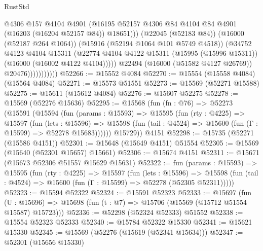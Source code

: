 \begin{lexlean}{RustStd}
\begin{coremodule}
                                @4306
                                @157
                                @4104
                                @4901
                                (@16195
                                  @52157
                                  @4306
                                  @84
                                  @4104
                                  @84
                                  @4901
                                  (@16203 (@16204 @52157 @84))
                                  @18651)))
                            (@22045 (@52183 @84))
                            (@16000 (@52187 @264 @1064))
                            (@15916 (@52194 @1064 @101 @5749 @4518))
                            (@34752
                              @4123
                              @4104
                              @15311
                              (@22774
                                @4104
                                @4122
                                @15311
                                (@15995 (@15996 @15311))
                                (@16000 (@16002 @4122 @4104)))))
                          @22494
                          (@16000 (@51582 @4127 @26769))
                          @20476)))))))))))
@52266 := @15552 @4084
@52270 := @15554 (@15558 @4084) (@15564 @4084)
@52271 := @15573 @51551
@52273 := @15569 (@52271 @15588)
@52275 := @15611 (@15612 @4084)
@52276 := @15607 @52275
@52278 := @15569 (@52276 @15636)
@52295 := @15568
    (fun (fn : @76) =>
    @52273
      (@15591
        (@15594
          (fun (params : @15593) =>
          @15595
            (fun (rty : @4225) =>
            @15597
              (fun (lets : @15596) =>
              @15598 (fun (tail : @4524) => @15600 (fun (Γ : @15599) => @52278 @15683))))))
        @15729))
    @4151
@52298 := @15735 (@52271 (@15586 @4151))
@52301 := @15648 (@15649 @4151) @51554
@52305 := @15569 (@15640 (@52301 @15657) @15661)
@52306 := @15674 @4151
@52311 := @15671 (@15673 @52306 @51557 @15629 @15631)
@52322 := fun (params : @15593) =>
  @15595
    (fun (rty : @4225) =>
    @15597
      (fun (lets : @15596) =>
      @15598 (fun (tail : @4524) => @15600 (fun (Γ : @15599) => @52278 (@52305 @52311)))))
@52323 := @15594 @52322
@52324 := @15591 @52323
@52333 := @15697
    (fun (U : @15696) => @15698 (fun (t : @7) => @15706 (@15569 (@15712 @51554 @15587) @15723)))
@52336 := @52298 (@52324 @52333) @51552
@52338 := @15554 @52323 @52333
@52340 := @15784 @52322 @15330
@52341 := @15621 @15330
@52345 := @15569 (@52276 (@15619 (@52341 @15634)))
@52347 := @52301 (@15656 @15330)

\end{coremodule}
\end{lexlean}
